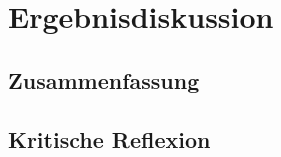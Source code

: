 \chapter{Ergebnisdiskussion}
\label{ch:Results}

\section{Zusammenfassung}

\section{Kritische Reflexion}